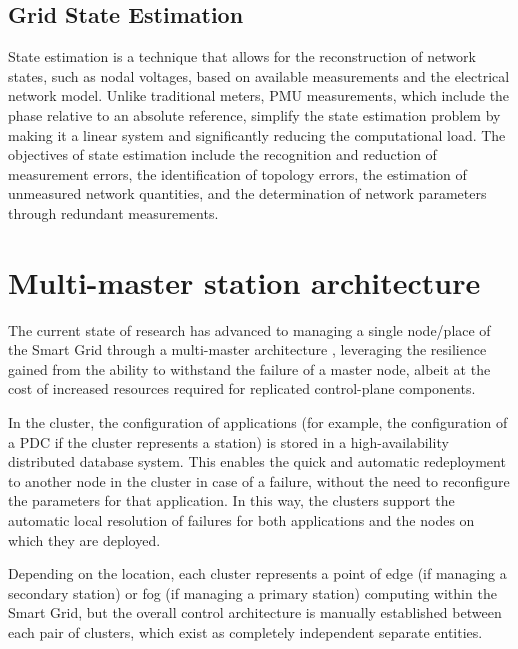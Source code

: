 \subsection{Grid State Estimation}
State estimation is a technique that allows for the reconstruction of network states, such as nodal voltages, based on available measurements and the electrical network model. Unlike traditional meters, PMU measurements, which include the phase relative to an absolute reference, simplify the state estimation problem by making it a linear system and significantly reducing the computational load. The objectives of state estimation include the recognition and reduction of measurement errors, the identification of topology errors, the estimation of unmeasured network quantities, and the determination of network parameters through redundant measurements.

\section{Multi-master station architecture}
The current state of research has advanced to managing a single node/place of the Smart Grid through a multi-master architecture \cite{a2-1}\cite{a2-2}, leveraging the resilience gained from the ability to withstand the failure of a master node, albeit at the cost of increased resources required for replicated control-plane components.

In the cluster, the configuration of applications (for example, the configuration of a PDC if the cluster represents a station) is stored in a high-availability distributed database system. This enables the quick and automatic redeployment to another node in the cluster in case of a failure, without the need to reconfigure the parameters for that application. In this way, the clusters support the automatic local resolution of failures for both applications and the nodes on which they are deployed.

Depending on the location, each cluster represents a point of edge (if managing a secondary station) or fog (if managing a primary station) computing within the Smart Grid, but the overall control architecture is manually established between each pair of clusters, which exist as completely independent separate entities.

